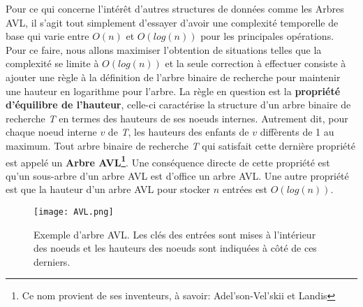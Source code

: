 Pour ce qui concerne l'intérêt d'autres structures de données comme les Arbres AVL, il s'agit tout simplement d'essayer d'avoir une complexité temporelle de base qui varie entre $O(n)$ et $O(log (n))$ pour les principales opérations. Pour ce faire, nous allons maximiser l'obtention de situations telles que la complexité se limite à $O(log (n))$ et la seule correction à effectuer consiste à ajouter une règle à la définition de l'arbre binaire de recherche pour maintenir une hauteur en logarithme pour l'arbre. La règle en question est la \textbf{propriété d'équilibre de l'hauteur}, celle-ci caractérise la structure d'un arbre binaire de recherche \textit{T} en termes des hauteurs de ses noeuds internes. Autrement dit, pour chaque noeud interne $\textit{v}$ de \textit{T}, les hauteurs des enfants de $\textit{v}$ diffèrents de 1 au maximum. Tout arbre binaire de recherche \textit{T} qui satisfait cette dernière propriété est appelé un \textbf{Arbre AVL\footnote{Ce nom provient de ses inventeurs, à savoir: Adel'son-Vel'skii et Landis}}. Une conséquence directe de cette propriété est qu'un sous-arbre d'un arbre AVL est d'office un arbre AVL. Une autre propriété est que la hauteur d'un arbre AVL pour stocker $\textit{n}$ entrées est $\textit{O}(log (\textit{n}))$.

\begin{figure} [!h]
\center
\texttt{[image: AVL.png]}
\caption{Exemple d'arbre AVL. Les clés des entrées sont mises à l'intérieur des noeuds et les hauteurs des noeuds sont indiquées à côté de ces derniers.}
\end{figure}